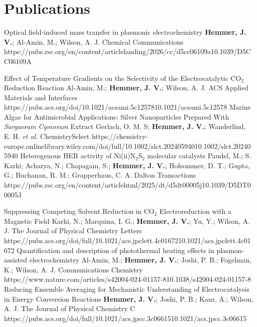 \documentclass[10pt, twoside, table]{article} %
\begin{document}
\section*{Publications}
\vspace{-\baselineskip}
\publication
	{Optical field-induced mass transfer in plasmonic electrochemistry}
	{\textbf{Hemmer, J. V.}; Al-Amin, M.; Wilson, A. J.}
	{Chemical Communications}
	{https://pubs.rsc.org/en/content/articlelanding/2026/cc/d5cc06109a}{10.1039/D5CC06109A}

\publication
	{Effect of Temperature Gradients on the Selectivity of the Electrocatalytic CO$_{2}$ Reduction Reaction}
	{Al-Amin, M.; \textbf{Hemmer, J. V.}; Wilson, A. J.}
	{ACS Applied Materials and Interfaces}
	{https://pubs.acs.org/doi/10.1021/acsami.5c12578}{10.1021/acsami.5c12578}
\publication
	{Marine Algae for Antimicrobial Applications: Silver Nanoparticles Prepared With \textit{Sargassum Cymosum} Extract}
	{Gerlach, O. M. S; \textbf{Hemmer, J. V.}; Wanderlind, E. H. \textit{et al.}}
	{ChemistrySelect}
	{https://chemistry-europe.onlinelibrary.wiley.com/doi/full/10.1002/slct.202405940}{10.1002/slct.202405940}
\publication
	{Heterogenous HER activity of Ni(ii)N$_{2}$S$_{2}$ molecular catalysts}
	{Paudel, M.; S. Karki; Acharya, N.; Chapagain, S.; \textbf{Hemmer, J. V.}; Hofsommer, D. T.; Gupta, G.; Buchanan, R. M.; Grapperhaus, C. A.}
	{Dalton Transactions}
	{https://pubs.rsc.org/en/content/articlehtml/2025/dt/d5dt00005j}{10.1039/D5DT00005J}

\centervdottofooter
\continuednewpage

\publication
	{Suppressing Competing Solvent Reduction in CO$_{\text{2}}$ Electroreduction with a Magnetic Field}
	{Karki, N.; Marquina, I. G.; \textbf{Hemmer, J. V.}; Yu, Y.; Wilson, A. J.}
	{The Journal of Physical Chemistry Letters}
	{https://pubs.acs.org/doi/full/10.1021/acs.jpclett.4c01672}{10.1021/acs.jpclett.4c01672}
\publication
	{Quantification and description of photothermal heating effects in plasmon-assisted electrochemistry}
	{Al-Amin, M.; \textbf{Hemmer, J. V.}; Joshi, P. B.; Fogelman, K.; Wilson, A. J.}
	{Communications Chemistry}
	{https://www.nature.com/articles/s42004-024-01157-8}{10.1038/s42004-024-01157-8}
\publication
	{Reducing Ensemble Averaging for Mechanistic Understanding of Electrocatalysis in Energy Conversion Reactions}
	{\textbf{Hemmer, J. V.}; Joshi, P. B.; Kaur, A.; Wilson, A. J.}
	{The Journal of Physical Chemistry C}
	{https://pubs.acs.org/doi/full/10.1021/acs.jpcc.3c06615}{10.1021/acs.jpcc.3c06615}
\end{document}
